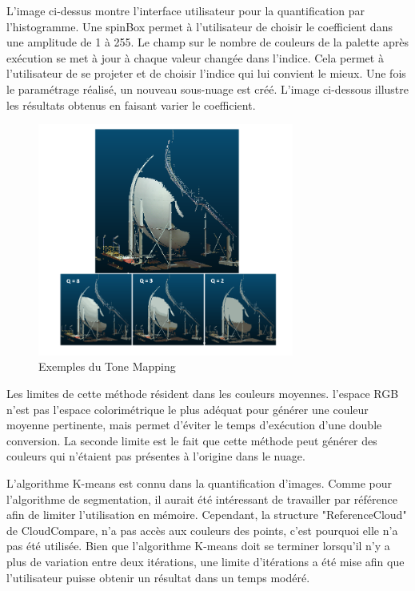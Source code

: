 \documentclass[12pt,titlepage,french]{article}
\begin{document}
L'image ci-dessus montre l'interface utilisateur pour la quantification par l'histogramme.
Une spinBox permet à l'utilisateur de choisir le coefficient dans une amplitude de 1 à 255.
 Le champ sur le nombre de couleurs de la palette après exécution se met à jour à chaque valeur changée dans l'indice. Cela permet à l'utilisateur de se projeter et de choisir l'indice qui lui convient le mieux. Une fois le paramétrage réalisé, un nouveau sous-nuage est créé. L'image ci-dessous illustre les résultats obtenus en faisant varier le coefficient.

\begin{figure}[H]
\center
\includegraphics[width=0.75\textwidth]{./img/ExpToonMapping.png}
\caption{\label{} Exemples du Tone Mapping}
\end{figure}

Les limites de cette méthode résident dans les couleurs moyennes.
l'espace RGB n'est pas l'espace colorimétrique le plus adéquat pour générer une couleur moyenne pertinente, mais permet d'éviter le temps d'exécution d'une double conversion.
La seconde limite est le fait que cette méthode peut générer des couleurs qui n'étaient pas présentes à l'origine dans le nuage.
\newline

L'algorithme K-means est connu dans la quantification d'images.
Comme pour l'algorithme de segmentation, il aurait été intéressant de travailler par référence afin de limiter l'utilisation en mémoire.
Cependant, la structure "ReferenceCloud" de CloudCompare, n'a pas accès aux couleurs des points, c'est pourquoi elle n'a pas été utilisée.
Bien que l'algorithme K-means doit se terminer lorsqu'il n'y a plus de variation entre deux itérations, une limite d'itérations a été mise afin que l'utilisateur puisse obtenir un résultat dans un temps modéré.
\newline
\end{document}
